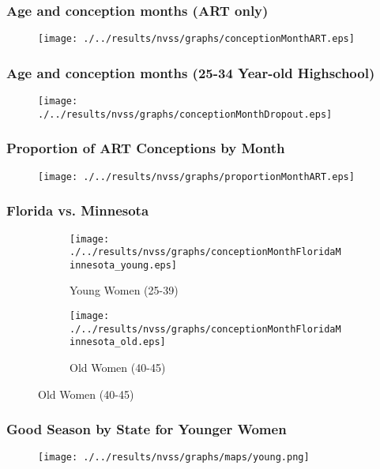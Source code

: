 \documentclass[10pt,letterpaper,subeqn]{beamer}
\begin{document}
\begin{frame}
\frametitle{Age and conception months (ART only)}
\begin{figure}[htpb!]
  \texttt{[image: ./../results/nvss/graphs/conceptionMonthART.eps]}
\end{figure}
\end{frame}

\begin{frame}
\frametitle{Age and conception months (25-34 Year-old Highschool)}
\begin{figure}[htpb!]
  \centering
  \texttt{[image: ./../results/nvss/graphs/conceptionMonthDropout.eps]}
\end{figure}
\end{frame}

\begin{frame}
\frametitle{Proportion of ART Conceptions by Month}
\begin{figure}[htpb!]
  \texttt{[image: ./../results/nvss/graphs/proportionMonthART.eps]}
\end{figure}
\end{frame}


\begin{frame}
\frametitle{Florida vs. Minnesota}
\begin{figure}[htpb!]
\begin{center}
\begin{subfigure}{.5\textwidth}
  \centering
  \texttt{[image: ./../results/nvss/graphs/conceptionMonthFloridaMinnesota\_young.eps]}
  \caption{Young Women (25-39)}
  \label{fig:conceptionsStatesYoung}
\end{subfigure}%
\begin{subfigure}{.5\textwidth}
  \centering
  \texttt{[image: ./../results/nvss/graphs/conceptionMonthFloridaMinnesota\_old.eps]}
  \caption{Old Women (40-45)}
  \label{fig:conceptionsStatesOld}
\end{subfigure}
\end{center}
\end{figure}
\end{frame}






\begin{frame}
\frametitle{Good Season by State for Younger Women}
\begin{figure}[htpb!]
\begin{center}
  \centering
  \texttt{[image: ./../results/nvss/graphs/maps/young.png]}
  \label{fig:mapYoung}
\end{center}
\end{figure}
\end{frame}
\end{document}
